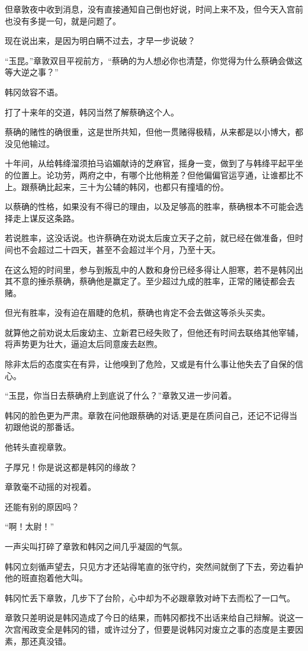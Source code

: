 但章敦夜中收到消息，没有直接通知自己倒也好说，时间上来不及，但今天入宫前也没有多提一句，就是问题了。

现在说出来，是因为明白瞒不过去，才早一步说破？

“玉昆。”章敦双目平视前方，“蔡确的为人想必你也清楚，你觉得为什么蔡确会做这等大逆之事？”

韩冈敛容不语。

打了十来年的交道，韩冈当然了解蔡确这个人。

蔡确的赌性的确很重，这是世所共知，但他一贯赌得极精，从来都是以小博大，都没见他输过。

十年间，从给韩绛溜须拍马谄媚献诗的芝麻官，摇身一变，做到了与韩绛平起平坐的位置上。论功劳，两府之中，有哪个比他稍差？但他偏偏官运亨通，让谁都比不上。跟蔡确比起来，三十为公辅的韩冈，也都只有撞墙的份。

以蔡确的性格，如果没有不得已的理由，以及足够高的胜率，蔡确根本不可能会选择走上谋反这条路。

若说胜率，这没话说。也许蔡确在劝说太后废立天子之前，就已经在做准备，但时间也不会超过二十四天，甚至不会超过半个月，乃至十天。

在这么短的时间里，参与到叛乱中的人数和身份已经多得让人胆寒，若不是韩冈出其不意的捶杀蔡确，蔡确他是赢定了。至少超过九成的胜率，正常的赌徒都会去赌。

但光有胜率，没有迫在眉睫的危机，蔡确也肯定不会去做这等杀头买卖。

就算他之前劝说太后废幼主、立新君已经失败了，但他还有时间去联络其他宰辅，将声势更为壮大，逼迫太后同意废去赵煦。

除非太后的态度实在有异，让他嗅到了危险，又或是有什么事让他失去了自保的信心。

“玉昆，你当日去蔡确府上到底说了什么？”章敦又进一步问着。

韩冈的脸色更为严肃。章敦在问他跟蔡确的对话,更是在质问自己，还记不记得当初跟他说的那番话。

他转头直视章敦。

子厚兄！你是说这都是韩冈的缘故？

章敦毫不动摇的对视着。

还能有别的原因吗？

“啊！太尉！”

一声尖叫打碎了章敦和韩冈之间几乎凝固的气氛。

韩冈立刻循声望去，只见方才还站得笔直的张守约，突然间就倒了下去，旁边看护他的班直抱着他大叫。

韩冈忙丢下章敦，几步下了台阶，心中却为不必跟章敦对峙下去而松了一口气。

章敦只差明说是韩冈造成了今日的结果，而韩冈都找不出话来给自己辩解。说这一次宫闱政变全是韩冈的错，或许过分了，但要是说韩冈对废立之事的态度是主要因素，那还真没错。

